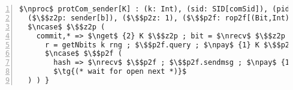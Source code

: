 \centering
\begin{lstlisting}[basicstyle=\scriptsize\BeraMonottFamily, frame=single, mathescape, numbers=left, xleftmargin=2em, xrightmargin=2em]
$\nproc$ protCom_sender[K] : (k: Int), (sid: SID[comSid]), (pid: Int), 
  ($\$$z2p: sender[b]), ($\$$p2z: 1), ($\$$p2f: rop2f[(Bit,Int)]), ($\$$f2p: 1) |- ($\$$c: 1) = {
  $\ncase$ $\$$z2p (
    commit,* => $\nget$ {2} K $\$$z2p ; bit = $\nrecv$ $\$$z2p 
      r = getNbits k rng ; $\$$p2f.query ; $\npay$ {1} K $\$$p2f ; $\nsend$ $\$$p2f pid ; $\nsend$ $\$$p2f (b,r)
      $\ncase$ $\$$p2f (
        hash => $\nrecv$ $\$$p2f ; $\$$p2f.sendmsg ; $\npay$ {1} K $\$$p2f ; $\nsend$ $\$$p2f (Commit h)
        $\tg{(* wait for open next *)}$
  ) ) }
\end{lstlisting}
\vspace{-0.5em}
\caption{The commit case for the sender in \protcom}
\label{fig:protcomsender}
